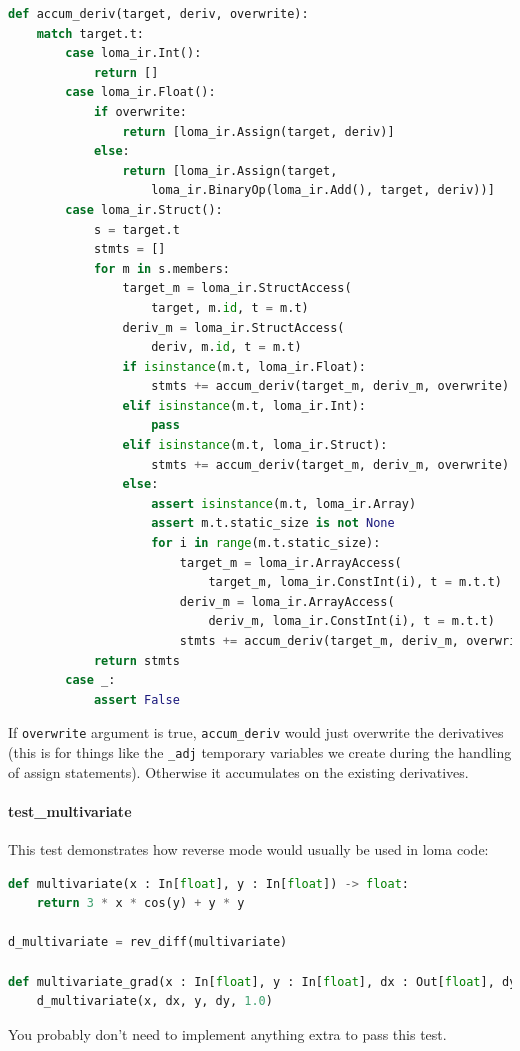 \begin{lstlisting}[language=Python]
def accum_deriv(target, deriv, overwrite):
    match target.t:
        case loma_ir.Int():
            return []
        case loma_ir.Float():
            if overwrite:
                return [loma_ir.Assign(target, deriv)]
            else:
                return [loma_ir.Assign(target,
                    loma_ir.BinaryOp(loma_ir.Add(), target, deriv))]
        case loma_ir.Struct():
            s = target.t
            stmts = []
            for m in s.members:
                target_m = loma_ir.StructAccess(
                    target, m.id, t = m.t)
                deriv_m = loma_ir.StructAccess(
                    deriv, m.id, t = m.t)
                if isinstance(m.t, loma_ir.Float):
                    stmts += accum_deriv(target_m, deriv_m, overwrite)
                elif isinstance(m.t, loma_ir.Int):
                    pass
                elif isinstance(m.t, loma_ir.Struct):
                    stmts += accum_deriv(target_m, deriv_m, overwrite)
                else:
                    assert isinstance(m.t, loma_ir.Array)
                    assert m.t.static_size is not None
                    for i in range(m.t.static_size):
                        target_m = loma_ir.ArrayAccess(
                            target_m, loma_ir.ConstInt(i), t = m.t.t)
                        deriv_m = loma_ir.ArrayAccess(
                            deriv_m, loma_ir.ConstInt(i), t = m.t.t)
                        stmts += accum_deriv(target_m, deriv_m, overwrite)
            return stmts
        case _:
            assert False
\end{lstlisting}
If \lstinline{overwrite} argument is true, \lstinline{accum_deriv} would just overwrite the derivatives (this is for things like the \lstinline{_adj} temporary variables we create during the handling of assign statements). Otherwise it accumulates on the existing derivatives. 

\paragraph{test_multivariate} This test demonstrates how reverse mode would usually be used in loma code:
\begin{lstlisting}[language=Python]
def multivariate(x : In[float], y : In[float]) -> float:
    return 3 * x * cos(y) + y * y

d_multivariate = rev_diff(multivariate)

def multivariate_grad(x : In[float], y : In[float], dx : Out[float], dy : Out[float]):
    d_multivariate(x, dx, y, dy, 1.0)
\end{lstlisting}
You probably don't need to implement anything extra to pass this test.


